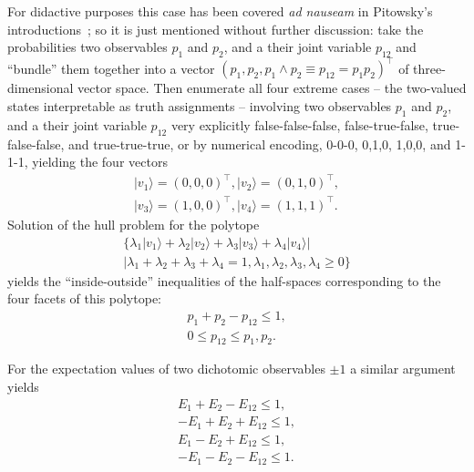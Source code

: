 \documentclass[%
  twocolumn,
 showpacs,
 showkeys,
 preprintnumbers,
 amsmath,amssymb,
 aps,
  pra,
  longbibliography,
 floatfix,
 ]{revtex4-1}
\begin{document}
For didactive purposes this case has been covered {\em ad nauseam} in Pitowsky's introductions~\cite{pitowsky-86,pitowsky,pitowsky-89a,Pit-91,Pit-94,2000-poly};
so it is just mentioned without further discussion:
take the probabilities two observables $p_1$ and $p_2$, and a their joint variable $p_{12}$
and ``bundle'' them together into  a vector
$\left( p_1, p_2, p_1\wedge p_2 \equiv p_{12}=p_1p_2\right)^\intercal$
of three-dimensional vector space.
Then enumerate all
four extreme cases -- the two-valued states interpretable as truth assignments --
involving two observables $p_1$ and $p_2$, and a their joint variable $p_{12}$
very explicitly false-false-false,  false-true-false, true-false-false, and true-true-true,
or by numerical encoding, 0-0-0, 0,1,0, 1,0,0, and 1-1-1,
yielding the four vectors
\begin{equation}
\begin{split}
\vert v_1 \rangle = \left( 0, 0, 0\right)^\intercal,
\vert v_2 \rangle =\left( 0, 1, 0\right)^\intercal,    \\
\vert v_3 \rangle =\left( 1, 0, 0\right)^\intercal,
\vert v_4 \rangle =\left( 1, 1, 1\right)^\intercal.
\label{2017-b-t-2-jpv}
\end{split}
\end{equation}
Solution of the hull problem for the polytope
\begin{equation}
\begin{split}
  \Big\{
\lambda_1 \vert v_1 \rangle  +
\lambda_2 \vert v_2 \rangle  +
\lambda_3 \vert v_3 \rangle  +
\lambda_4 \vert v_4 \rangle  \Big|    \qquad
\\  \Big|
\lambda_1    +
\lambda_2    +
\lambda_3    +
\lambda_4  =1,
\lambda_1,
\lambda_2,
\lambda_3,
\lambda_4\ge 0
\Big\}
\label{2017-b-t-2-jpcp}
\end{split}
\end{equation}
yields the ``inside-outside'' inequalities of the half-spaces corresponding to the four facets of this polytope:
\begin{equation}
\begin{split}
p_1 + p_2 - p_{12}  \le  1,  \\
0\le p_{12}  \le  p_1 ,  p_2
.
\end{split}
\label{2017-b-1-2-p-c}
\end{equation}

For the expectation values  of two dichotomic observables  $\pm 1$   a similar argument yields
\begin{equation}
\begin{split}
  E_1 + E_2  - E_{12} \le 1 ,     \\
 -E_1 +E_2 +E_{12}   \le 1  ,     \\
  E_1  -E_2 + E_{12}    \le 1,    \\
 -E_1  -E_2  -E_{12}    \le 1.
\end{split}
\label{2017-b-1-2-E-c}
\end{equation}
\end{document}
